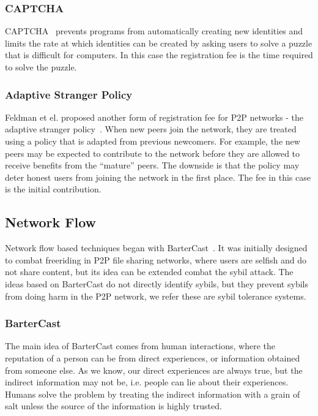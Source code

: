 \subsubsection{CAPTCHA}
CAPTCHA~\cite{von2003captcha} prevents programs from automatically creating new
identities and limits the rate at which identities can be created by asking
users to solve a puzzle that is difficult for computers. In this case the
registration fee is the time required to solve the puzzle.

\subsubsection{Adaptive Stranger Policy}
Feldman et el. proposed another form of registration fee for P2P networks - the
adaptive stranger policy~\cite{feldman2004robust}. When new peers join the
network, they are treated using a policy that is adapted from previous
newcomers. For example, the new peers may be expected to contribute to the
network before they are allowed to receive benefits from the ``mature'' peers.
The downside is that the policy may deter honest users from joining the network
in the first place. The fee in this case is the initial contribution.


\subsection{Network Flow}\label{sec:network-flow}
Network flow based techniques began with
BarterCast~\cite{meulpolder2009bartercast}. It was initially designed to combat
freeriding in P2P file sharing networks, where users are selfish and do not
share content, but its idea can be extended combat the sybil attack. The ideas
based on BarterCast do not directly identify sybils, but they prevent sybils
from doing harm in the P2P network, we refer these are sybil tolerance systems.

\subsubsection{BarterCast}
The main idea of BarterCast comes from human interactions, where the reputation
of a person can be from direct experiences, or information obtained from someone
else. As we know, our direct experiences are always true, but the indirect
information may not be, i.e. people can lie about their experiences. Humans
solve the problem by treating the indirect information with a grain of salt
unless the source of the information is highly trusted.

